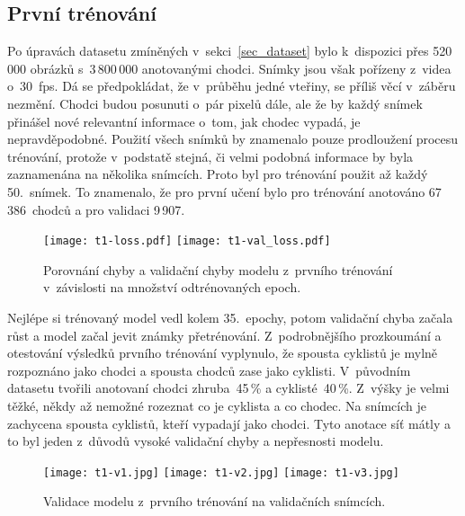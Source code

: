 
\subsection*{První trénování}

Po úpravách datasetu zmíněných v~sekci~\ref{sec_dataset} bylo k~dispozici přes 520\,000 obrázků s~3\,800\,000 anotovanými chodci. Snímky jsou však pořízeny z~videa o~30~fps. Dá se předpokládat, že v~průběhu jedné vteřiny, se příliš věcí v~záběru nezmění. Chodci budou posunuti o~pár pixelů dále, ale že by každý snímek přinášel nové relevantní informace o~tom, jak chodec vypadá, je nepravděpodobné. Použití všech snímků by znamenalo pouze prodloužení procesu trénování, protože v~podstatě stejná, či velmi podobná informace by byla zaznamenána na několika snímcích. Proto byl pro trénování použit až každý 50.~snímek. To znamenalo, že pro první učení bylo pro trénování anotováno 67\,386~chodců a pro validaci 9\,907.

\begin{figure}[H]
    \centering
    \texttt{[image: t1-loss.pdf]}\hfill
    \texttt{[image: t1-val\_loss.pdf]}
    \caption[Chyba a validační chyba prvního trénování]{Porovnání chyby a validační chyby modelu z~prvního trénování v~závislosti na množství odtrénovaných epoch.}
    \label{fig_train1_graph}
\end{figure}

Nejlépe si trénovaný model vedl kolem 35.~epochy, potom validační chyba začala růst a model začal jevit známky přetrénování. Z~podrobnějšího prozkoumání a otestování výsledků prvního trénování vyplynulo, že spousta cyklistů je mylně rozpoznáno jako chodci a spousta chodců zase jako cyklisti. V~původním datasetu tvořili anotovaní chodci zhruba~45\,\% a cyklisté~40\,\%. Z~výšky je velmi těžké, někdy až nemožné rozeznat co je cyklista a co chodec. Na snímcích je zachycena spousta cyklistů, kteří vypadají jako chodci. Tyto anotace síť mátly a to byl jeden z~důvodů vysoké validační chyby a nepřesnosti modelu.

\begin{figure}[H]
    \centering
    \texttt{[image: t1-v1.jpg]}\hfill
    \texttt{[image: t1-v2.jpg]}\hfill
    \texttt{[image: t1-v3.jpg]}
    \caption[Validace modelu z~prvního trénování na validačních snímcích]{Validace modelu z~prvního trénování na validačních snímcích.}
    \label{fig_train1_val_img}
\end{figure}


